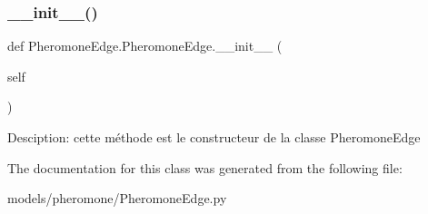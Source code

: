 \subsubsection{\texorpdfstring{\+\_\+\+\_\+init\+\_\+\+\_\+()}{\_\_init\_\_()}}
{\footnotesize\ttfamily def Pheromone\+Edge.\+Pheromone\+Edge.\+\_\+\+\_\+init\+\_\+\+\_\+ (\begin{DoxyParamCaption}\item[{}]{self }\end{DoxyParamCaption})}

\begin{DoxyVerb}Desciption: cette méthode est le constructeur de la classe PheromoneEdge
\end{DoxyVerb}
 

The documentation for this class was generated from the following file\+:\begin{DoxyCompactItemize}
\item 
models/pheromone/Pheromone\+Edge.\+py\end{DoxyCompactItemize}
